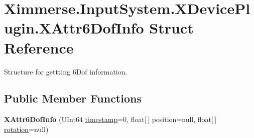\hypertarget{struct_ximmerse_1_1_input_system_1_1_x_device_plugin_1_1_x_attr6_dof_info}{}\section{Ximmerse.\+Input\+System.\+X\+Device\+Plugin.\+X\+Attr6\+Dof\+Info Struct Reference}
\label{struct_ximmerse_1_1_input_system_1_1_x_device_plugin_1_1_x_attr6_dof_info}


Structure for gettting 6\+Dof information.  


\subsection*{Public Member Functions}
\begin{DoxyCompactItemize}
\item 
\mbox{\label{struct_ximmerse_1_1_input_system_1_1_x_device_plugin_1_1_x_attr6_dof_info_a7231b4a0f622b7c32b13fb00359c1eec}} 
{\bfseries X\+Attr6\+Dof\+Info} (U\+Int64 \mbox{\hyperlink{struct_ximmerse_1_1_input_system_1_1_x_device_plugin_1_1_x_attr6_dof_info_ac2f72ee892f162752fbb90b70f330099}{timestamp}}=0, float\mbox{[}$\,$\mbox{]} position=null, float\mbox{[}$\,$\mbox{]} \mbox{\hyperlink{struct_ximmerse_1_1_input_system_1_1_x_device_plugin_1_1_x_attr6_dof_info_a3d361a8a8a5a16812d7b766573d50e45}{rotation}}=null)
\end{DoxyCompactItemize}
